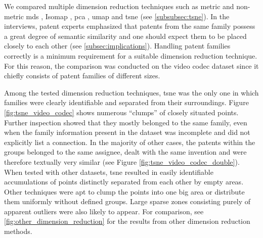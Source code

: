We compared multiple dimension reduction techniques such as metric and non-metric \gls{mds} \cite{OConnell2006}, Isomap \cite{Tenenbaum2000}, \gls{pca} \cite{hotelling1933analysis}, \gls{umap} \cite{McInnes2018} and \gls{tsne} (see \autoref{subsubsec:tsne}).
In the interviews, patent experts emphasized that patents from the same family possess a great degree of semantic similarity and one should expect them to be placed closely to each other (see \autoref{subsec:implications}).
Handling patent families correctly is a minimum requirement for a suitable dimension reduction technique.
For this reason, the comparison was conducted on the video codec dataset since it chiefly consists of patent families of different sizes.

Among the tested dimension reduction techniques, \gls{tsne} was the only one in which families were clearly identifiable and separated from their surroundings.
Figure \autoref{fig:tsne_video_codec} shows numerous ``clumps'' of closely situated points.
Further inspection showed that they mostly belonged to the same family, even when the family information present in the dataset was incomplete and did not explicitly list a connection.
In the majority of other cases, the patents within the groups belonged to the same assignee, dealt with the same invention and were therefore textually very similar (see Figure \autoref{fig:tsne_video_codec_double}).
When tested with other datasets, \gls{tsne} resulted in easily identifiable accumulations of points distinctly separated from each other by empty areas.
Other techniques were apt to clump the points into one big area or distribute them uniformly without defined groups.
Large sparse zones consisting purely of apparent outliers were also likely to appear.
For comparison, see \autoref{fig:other_dimension_reduction} for the results from other dimension reduction methods.

